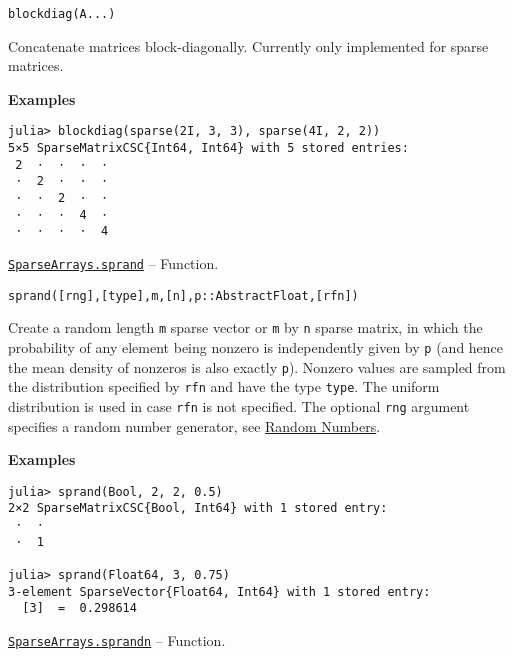 \begin{adjustwidth}{2em}{0pt}


\begin{verbatim}
blockdiag(A...)
\end{verbatim}

Concatenate matrices block-diagonally. Currently only implemented for sparse matrices.

\textbf{Examples}


\begin{verbatim}
julia> blockdiag(sparse(2I, 3, 3), sparse(4I, 2, 2))
5×5 SparseMatrixCSC{Int64, Int64} with 5 stored entries:
 2  ⋅  ⋅  ⋅  ⋅
 ⋅  2  ⋅  ⋅  ⋅
 ⋅  ⋅  2  ⋅  ⋅
 ⋅  ⋅  ⋅  4  ⋅
 ⋅  ⋅  ⋅  ⋅  4
\end{verbatim}



\end{adjustwidth}
\hypertarget{10437881912081266792}{}
\hyperlink{10437881912081266792}{\texttt{SparseArrays.sprand}}  -- {Function.}

\begin{adjustwidth}{2em}{0pt}


\begin{verbatim}
sprand([rng],[type],m,[n],p::AbstractFloat,[rfn])
\end{verbatim}

Create a random length \texttt{m} sparse vector or \texttt{m} by \texttt{n} sparse matrix, in which the probability of any element being nonzero is independently given by \texttt{p} (and hence the mean density of nonzeros is also exactly \texttt{p}). Nonzero values are sampled from the distribution specified by \texttt{rfn} and have the type \texttt{type}. The uniform distribution is used in case \texttt{rfn} is not specified. The optional \texttt{rng} argument specifies a random number generator, see \href{@ref}{Random Numbers}.

\textbf{Examples}


\begin{verbatim}
julia> sprand(Bool, 2, 2, 0.5)
2×2 SparseMatrixCSC{Bool, Int64} with 1 stored entry:
 ⋅  ⋅
 ⋅  1

julia> sprand(Float64, 3, 0.75)
3-element SparseVector{Float64, Int64} with 1 stored entry:
  [3]  =  0.298614
\end{verbatim}



\end{adjustwidth}
\hypertarget{3588082437273281277}{}
\hyperlink{3588082437273281277}{\texttt{SparseArrays.sprandn}}  -- {Function.}

